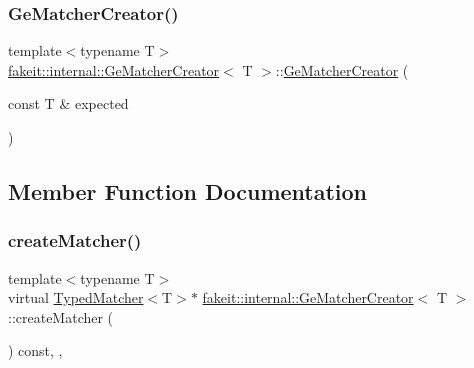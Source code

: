 \mbox{\label{structfakeit_1_1internal_1_1GeMatcherCreator_a71dea5672e8e0df897ed4a4f12e266ce}} 
\subsubsection{\texorpdfstring{GeMatcherCreator()}{GeMatcherCreator()}\hspace{0.1cm}{\footnotesize\ttfamily [9/9]}}
{\footnotesize\ttfamily template$<$typename T$>$ \\
\mbox{\hyperlink{structfakeit_1_1internal_1_1GeMatcherCreator}{fakeit\+::internal\+::\+Ge\+Matcher\+Creator}}$<$ T $>$\+::\mbox{\hyperlink{structfakeit_1_1internal_1_1GeMatcherCreator}{Ge\+Matcher\+Creator}} (\begin{DoxyParamCaption}\item[{const T \&}]{expected }\end{DoxyParamCaption})\hspace{0.3cm}{\ttfamily [inline]}}



\subsection{Member Function Documentation}
\mbox{\label{structfakeit_1_1internal_1_1GeMatcherCreator_abdd98f20fef3c4eae426d4f6e31e24b2}} 
\subsubsection{\texorpdfstring{createMatcher()}{createMatcher()}\hspace{0.1cm}{\footnotesize\ttfamily [1/9]}}
{\footnotesize\ttfamily template$<$typename T$>$ \\
virtual \mbox{\hyperlink{structfakeit_1_1TypedMatcher}{Typed\+Matcher}}$<$T$>$$\ast$ \mbox{\hyperlink{structfakeit_1_1internal_1_1GeMatcherCreator}{fakeit\+::internal\+::\+Ge\+Matcher\+Creator}}$<$ T $>$\+::create\+Matcher (\begin{DoxyParamCaption}{ }\end{DoxyParamCaption}) const\hspace{0.3cm}{\ttfamily [inline]}, {\ttfamily [override]}, {\ttfamily [virtual]}}



